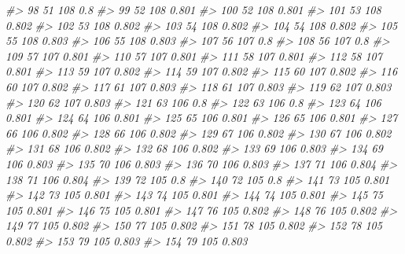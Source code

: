 \documentclass[]{book}
\newenvironment{Shaded}{\begin{snugshade}}{\end{snugshade}}
\newcommand{\CommentTok}[1]{\textcolor[rgb]{0.56,0.35,0.01}{\textit{#1}}}
\begin{document}
\begin{Shaded}
\begin{Highlighting}[]
\CommentTok{#> 98          51      108   0.8}
\CommentTok{#> 99          52      108 0.801}
\CommentTok{#> 100         52      108 0.801}
\CommentTok{#> 101         53      108 0.802}
\CommentTok{#> 102         53      108 0.802}
\CommentTok{#> 103         54      108 0.802}
\CommentTok{#> 104         54      108 0.802}
\CommentTok{#> 105         55      108 0.803}
\CommentTok{#> 106         55      108 0.803}
\CommentTok{#> 107         56      107   0.8}
\CommentTok{#> 108         56      107   0.8}
\CommentTok{#> 109         57      107 0.801}
\CommentTok{#> 110         57      107 0.801}
\CommentTok{#> 111         58      107 0.801}
\CommentTok{#> 112         58      107 0.801}
\CommentTok{#> 113         59      107 0.802}
\CommentTok{#> 114         59      107 0.802}
\CommentTok{#> 115         60      107 0.802}
\CommentTok{#> 116         60      107 0.802}
\CommentTok{#> 117         61      107 0.803}
\CommentTok{#> 118         61      107 0.803}
\CommentTok{#> 119         62      107 0.803}
\CommentTok{#> 120         62      107 0.803}
\CommentTok{#> 121         63      106   0.8}
\CommentTok{#> 122         63      106   0.8}
\CommentTok{#> 123         64      106 0.801}
\CommentTok{#> 124         64      106 0.801}
\CommentTok{#> 125         65      106 0.801}
\CommentTok{#> 126         65      106 0.801}
\CommentTok{#> 127         66      106 0.802}
\CommentTok{#> 128         66      106 0.802}
\CommentTok{#> 129         67      106 0.802}
\CommentTok{#> 130         67      106 0.802}
\CommentTok{#> 131         68      106 0.802}
\CommentTok{#> 132         68      106 0.802}
\CommentTok{#> 133         69      106 0.803}
\CommentTok{#> 134         69      106 0.803}
\CommentTok{#> 135         70      106 0.803}
\CommentTok{#> 136         70      106 0.803}
\CommentTok{#> 137         71      106 0.804}
\CommentTok{#> 138         71      106 0.804}
\CommentTok{#> 139         72      105   0.8}
\CommentTok{#> 140         72      105   0.8}
\CommentTok{#> 141         73      105 0.801}
\CommentTok{#> 142         73      105 0.801}
\CommentTok{#> 143         74      105 0.801}
\CommentTok{#> 144         74      105 0.801}
\CommentTok{#> 145         75      105 0.801}
\CommentTok{#> 146         75      105 0.801}
\CommentTok{#> 147         76      105 0.802}
\CommentTok{#> 148         76      105 0.802}
\CommentTok{#> 149         77      105 0.802}
\CommentTok{#> 150         77      105 0.802}
\CommentTok{#> 151         78      105 0.802}
\CommentTok{#> 152         78      105 0.802}
\CommentTok{#> 153         79      105 0.803}
\CommentTok{#> 154         79      105 0.803}

\end{Highlighting}
\end{Shaded}
\end{document}
